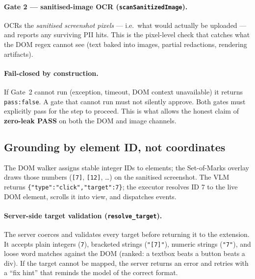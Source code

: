 \documentclass[11pt,a4paper]{article}
\newcommand{\code}[1]{\texttt{#1}}
\begin{document}
\paragraph{Gate 2 --- sanitised-image OCR (\code{scanSanitizedImage}).}
OCRs the \emph{sanitised screenshot pixels} --- i.e.\ what would actually be uploaded --- and reports any surviving PII hits. This is the pixel-level check that catches what the DOM regex cannot see (text baked into images, partial redactions, rendering artifacts).

\paragraph{Fail-closed by construction.}
If Gate~2 cannot run (exception, timeout, DOM context unavailable) it returns \code{pass:false}. A gate that cannot run must not silently approve. Both gates must explicitly pass for the step to proceed. This is what allows the honest claim of \textbf{zero-leak PASS} on both the DOM and image channels.

\subsection{Grounding by element ID, not coordinates}
The DOM walker assigns stable integer IDs to elements; the Set-of-Marks overlay draws those numbers (\code{[7]}, \code{[12]}, \ldots) on the sanitised screenshot. The VLM returns \code{\{"type":"click","target":7\}}; the executor resolves ID 7 to the live DOM element, scrolls it into view, and dispatches events.

\paragraph{Server-side target validation (\code{resolve\_target}).}
The server coerces and validates every target before returning it to the extension. It accepts plain integers (\code{7}), bracketed strings (\code{"[7]"}), numeric strings (\code{"7"}), and loose word matches against the DOM (ranked: a textbox beats a button beats a div). If the target cannot be mapped, the server returns an error and retries with a ``fix hint'' that reminds the model of the correct format.
\end{document}
